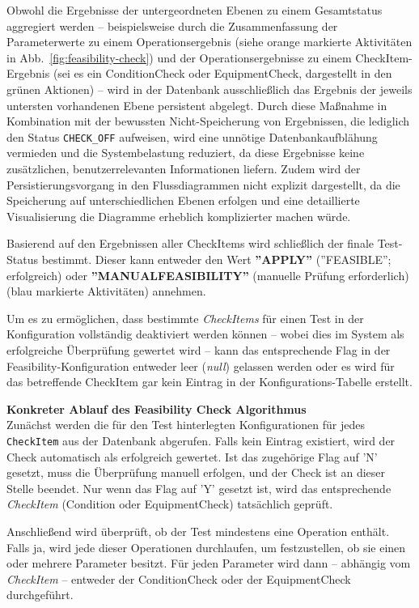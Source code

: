 Obwohl die Ergebnisse der untergeordneten Ebenen zu einem Gesamtstatus aggregiert werden – beispielsweise durch die Zusammenfassung der Parameterwerte zu einem Operationsergebnis (siehe orange markierte Aktivitäten in Abb. \ref{fig:feasibility-check}) und der Operationsergebnisse zu einem CheckItem-Ergebnis (sei es ein \gls{ConditionCheck} oder \gls{EquipmentCheck}, dargestellt in den grünen Aktionen) – wird in der Datenbank ausschließlich das Ergebnis der jeweils untersten vorhandenen Ebene persistent abgelegt. Durch diese Maßnahme in Kombination mit der bewussten Nicht-Speicherung von Ergebnissen, die lediglich den Status \texttt{CHECK\_OFF} aufweisen, wird eine unnötige Datenbankaufblähung vermieden und die Systembelastung reduziert, da diese Ergebnisse keine zusätzlichen, benutzerrelevanten Informationen liefern. Zudem wird der Persistierungsvorgang in den Flussdiagrammen nicht explizit dargestellt, da die Speicherung auf unterschiedlichen Ebenen erfolgen und eine detaillierte Visualisierung die Diagramme erheblich komplizierter machen würde.

Basierend auf den Ergebnissen aller CheckItems wird schließlich der finale Test-Status bestimmt. Dieser kann entweder den Wert \textbf{''APPLY''} (''FEASIBLE''; erfolgreich) oder \textbf{''MANUALFEASIBILITY''} (manuelle Prüfung erforderlich) (blau markierte Aktivitäten) annehmen.

Um es zu ermöglichen, dass bestimmte \textit{CheckItems} für einen Test in der Konfiguration vollständig deaktiviert werden können – wobei dies im System als erfolgreiche Überprüfung gewertet wird – kann das entsprechende Flag in der Feasibility-Konfiguration entweder leer (\textit{null}) gelassen werden oder es wird für das betreffende CheckItem gar kein Eintrag in der Konfigurations-Tabelle erstellt. 

\textbf{Konkreter Ablauf des Feasibility Check Algorithmus} \\
Zunächst werden die für den Test hinterlegten Konfigurationen für jedes \texttt{CheckItem} aus der Datenbank abgerufen. Falls kein Eintrag existiert, wird der Check automatisch als erfolgreich gewertet. Ist das zugehörige Flag auf 'N' gesetzt, muss die Überprüfung manuell erfolgen, und der Check ist an dieser Stelle beendet. Nur wenn das Flag auf 'Y' gesetzt ist, wird das entsprechende \textit{CheckItem} (Condition oder \gls{EquipmentCheck}) tatsächlich geprüft.

Anschließend wird überprüft, ob der Test mindestens eine Operation enthält. Falls ja, wird jede dieser Operationen durchlaufen, um festzustellen, ob sie einen oder mehrere Parameter besitzt. Für jeden Parameter wird dann – abhängig vom \textit{CheckItem} – entweder der \gls{ConditionCheck} oder der \gls{EquipmentCheck} durchgeführt.

